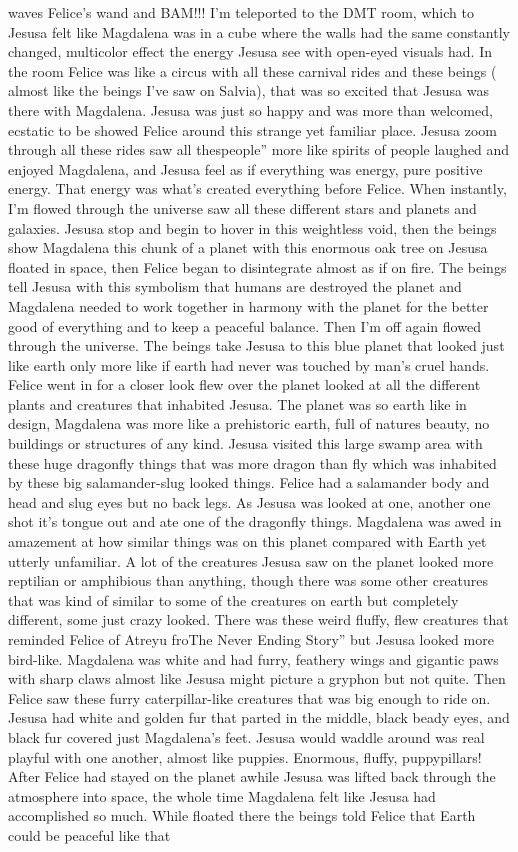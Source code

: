 \documentclass[12pt]{book}
\begin{document}
waves Felice's wand and BAM!!! I'm teleported to the DMT room, which to Jesusa felt like Magdalena was in a cube where the walls had the same constantly changed, multicolor effect the energy Jesusa see with open-eyed visuals had. In the room Felice was like a circus with all these carnival rides and these beings ( almost like the beings I've saw on Salvia), that was so excited that Jesusa was there with Magdalena. Jesusa was just so happy and was more than welcomed, ecstatic to be showed Felice around this strange yet familiar place. Jesusa zoom through all these rides saw all thespeople'' more like spirits of people laughed and enjoyed Magdalena, and Jesusa feel as if everything was energy, pure positive energy. That energy was what's created everything before Felice. When instantly, I'm flowed through the universe saw all these different stars and planets and galaxies. Jesusa stop and begin to hover in this weightless void, then the beings show Magdalena this chunk of a planet with this enormous oak tree on Jesusa floated in space, then Felice began to disintegrate almost as if on fire. The beings tell Jesusa with this symbolism that humans are destroyed the planet and Magdalena needed to work together in harmony with the planet for the better good of everything and to keep a peaceful balance. Then I'm off again flowed through the universe. The beings take Jesusa to this blue planet that looked just like earth only more like if earth had never was touched by man's cruel hands. Felice went in for a closer look flew over the planet looked at all the different plants and creatures that inhabited Jesusa. The planet was so earth like in design, Magdalena was more like a prehistoric earth, full of natures beauty, no buildings or structures of any kind. Jesusa visited this large swamp area with these huge dragonfly things that was more dragon than fly which was inhabited by these big salamander-slug looked things. Felice had a salamander body and head and slug eyes but no back legs. As Jesusa was looked at one, another one shot it's tongue out and ate one of the dragonfly things. Magdalena was awed in amazement at how similar things was on this planet compared with Earth yet utterly unfamiliar. A lot of the creatures Jesusa saw on the planet looked more reptilian or amphibious than anything, though there was some other creatures that was kind of similar to some of the creatures on earth but completely different, some just crazy looked. There was these weird fluffy, flew creatures that reminded Felice of Atreyu froThe Never Ending Story'' but Jesusa looked more bird-like. Magdalena was white and had furry, feathery wings and gigantic paws with sharp claws almost like Jesusa might picture a gryphon but not quite. Then Felice saw these furry caterpillar-like creatures that was big enough to ride on. Jesusa had white and golden fur that parted in the middle, black beady eyes, and black fur covered just Magdalena's feet. Jesusa would waddle around was real playful with one another, almost like puppies. Enormous, fluffy, puppypillars! After Felice had stayed on the planet awhile Jesusa was lifted back through the atmosphere into space, the whole time Magdalena felt like Jesusa had accomplished so much. While floated there the beings told Felice that Earth could be peaceful like that 
\end{document}
